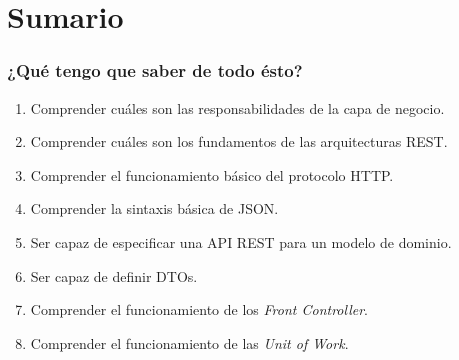 \documentclass[handout,a4paper,slidestop,xcolor=pst,blue]{beamer}
\begin{document}
\section{Sumario}

\begin{frame}[c]
    \frametitle{¿Qué tengo que saber de todo ésto?}
    \begin{enumerate}[<+->]
        \item Comprender cuáles son las responsabilidades de la capa de negocio.
        \item Comprender cuáles son los fundamentos de las arquitecturas REST.
        \item Comprender el funcionamiento básico del protocolo HTTP.
        \item Comprender la sintaxis básica de JSON.
        \item Ser capaz de especificar una API REST para un modelo de dominio.
        \item Ser capaz de definir DTOs.
        \item Comprender el funcionamiento de los \emph{Front Controller}.
        \item Comprender el funcionamiento de las \emph{Unit of Work}.
    \end{enumerate}
\end{frame}
\end{document}
